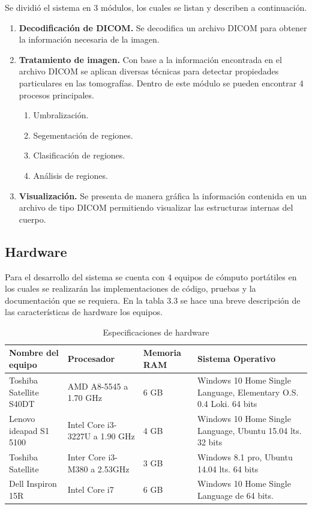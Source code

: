 \documentclass[12pt]{report}
\begin{document}
Se dividió el sistema en 3 módulos, los cuales se listan y describen a continuación.

\begin{enumerate}[{Módulo} 1.]
\item \textbf{Decodificación de DICOM.} Se decodifica  un archivo DICOM para obtener la información necesaria de la imagen.
\item \textbf{Tratamiento de imagen.} Con base a la información encontrada en el archivo DICOM se aplican diversas técnicas para detectar propiedades particulares en las tomografías. Dentro de este módulo se pueden encontrar 4 procesos principales.
\begin{enumerate}
\item Umbralización.
\item Segementación de regiones.
\item Clasificación de regiones.
\item Análisis de regiones.
\end{enumerate}
\item \textbf{Visualización.} Se presenta de manera gráfica la información contenida en un archivo de tipo DICOM permitiendo visualizar las estructuras internas del cuerpo.
\end{enumerate}

\subsection{Hardware}
Para el desarrollo del sistema se cuenta con 4 equipos de cómputo portátiles en los cuales se realizarán las implementaciones de código, pruebas y la documentación que se requiera. En la tabla 3.3 se hace una breve descripción de las características de hardware los equipos.

\begin{table}[H]
\begin{center}
\begin{tabular}{|p{30mm}|p{30mm}|p{20mm}|p{40mm}|}
\hline
 Nombre del equipo & Procesador & Memoria RAM & Sistema Operativo\\
\hline \hline 
Toshiba Satellite S40DT & AMD A8-5545 a 1.70 GHz  & 6 GB & Windows 10 Home Single Language, Elementary O.S. 0.4 Loki. 64 bits\\
\hline
Lenovo ideapad S1 5100 & Intel Core i3-3227U a 1.90 GHz & 4 GB & Windows 10 Home Single Language, Ubuntu 15.04 lts. 32 bits\\
\hline
Toshiba Satellite  & Inter Core i3-M380 a 2.53GHz  & 3 GB & Windows 8.1 pro, Ubuntu 14.04 lts. 64 bits\\
\hline
Dell Inspiron 15R & Intel Core i7 & 6 GB & Windows 10 Home Single Language de 64 bits. \\
\hline
\end{tabular}
\caption{Especificaciones de hardware}
\end{center}
\end{table}
\end{document}
